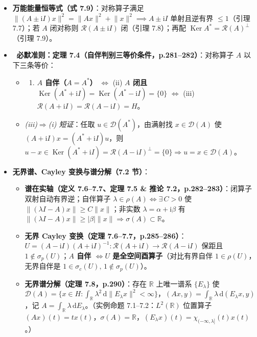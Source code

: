 \documentclass[11pt,a4paper]{article}
\providecommand{\tightlist}{\setlength{\itemsep}{1.8pt}\setlength{\parskip}{0pt}}
\newcommand{\WarnBadge}{%
  \tcbox[on line, colback=CoralSoft, colframe=CoralMain!45!BorderColor, boxrule=0.35pt,
    arc=3pt, left=3.5pt, right=3.5pt, top=0.5pt, bottom=0.5pt, boxsep=0pt]{\scriptsize\bfseries\color{CoralMain}注意}\,%
}
\begin{document}
\begin{itemize}
\tightlist
\item
  \textbf{万能能量恒等式（式 7.9）}：对称算子满足 \(\lVert(A\pm\mathrm{i}I)x\rVert^2=\lVert Ax\rVert^2+\lVert x\rVert^2\implies A\pm\mathrm{i}I\) 单射且逆有界 \(\le 1\)（引理 7.7）；若 \(A\) 闭对称则 \(\mathcal{R}(A\pm\mathrm{i}I)\) 闭（引理 7.8）；再配 \(\operatorname{Ker}A^*=\mathcal{R}(A)^\perp\)（引理 7.9）。
\item
  \textbf{\WarnBadge{} 必默准则：定理 7.4（自伴判别三等价条件，p.281--282）}：对称算子 \(A\) 以下三条等价：

  \begin{itemize}
  \tightlist
  \item
    \begin{enumerate}
    \def\labelenumi{(\roman{enumi})}
    \tightlist
    \item
      \textbf{\(A\) 自伴（\(A=A^*\)）} \(\iff\) (ii) \textbf{\(A\) 闭且 \(\operatorname{Ker}(A^*+\mathrm{i}I)=\operatorname{Ker}(A^*-\mathrm{i}I)=\{0\}\)} \(\iff\) (iii) \textbf{\(\mathcal{R}(A+\mathrm{i}I)=\mathcal{R}(A-\mathrm{i}I)=H\)}。
    \end{enumerate}
  \item
    \emph{(iii)\(\Rightarrow\)(i) 短证}：任取 \(u\in\mathcal{D}(A^*)\)，由满射找 \(x\in\mathcal{D}(A)\) 使 \((A+\mathrm{i}I)x=(A^*+\mathrm{i}I)u\)，则 \(u-x\in\operatorname{Ker}(A^*+\mathrm{i}I)=\mathcal{R}(A-\mathrm{i}I)^\perp=\{0\}\Rightarrow u=x\in\mathcal{D}(A)\)。
  \end{itemize}
\item
  \textbf{无界谱、Cayley 变换与谱分解（7.2 节）}：

  \begin{itemize}
  \tightlist
  \item
    \textbf{谱在实轴（定义 7.6--7.7、定理 7.5 \& 推论 7.2，p.282--283）}：闭算子双射自动有界逆；自伴算子 \(\lambda\in\rho(A)\iff\exists\,C>0\) 使 \(\lVert(\lambda I-A)x\rVert\ge C\lVert x\rVert\)；非实数 \(\lambda=\alpha+\mathrm{i}\beta\) 有 \(\lVert(\lambda I-A)x\rVert\ge\lvert\beta\rvert\lVert x\rVert\Rightarrow\sigma(A)\subset\mathbb{R}\)。
  \item
    \textbf{无界 Cayley 变换（定理 7.6--7.7，p.285--286）}：\(U=(A-\mathrm{i}I)(A+\mathrm{i}I)^{-1}:\mathcal{R}(A+\mathrm{i}I)\to\mathcal{R}(A-\mathrm{i}I)\) 保距且 \(1\notin\sigma_p(U)\)；\textbf{\(A\) 自伴 \(\iff U\) 是全空间酉算子}（对比有界自伴 \(1\in\rho(U)\)，无界自伴是 \(1\in\sigma_c(U),\,1\notin\sigma_p(U)\)）。
  \item
    \textbf{无界谱分解（定理 7.8，p.290）}：存在 \(\mathbb{R}\) 上唯一谱系 \(\{E_\lambda\}\) 使 \(\mathcal{D}(A)=\{x\in H:\int_{\mathbb{R}}\lambda^2\,\mathrm{d}\lVert E_\lambda x\rVert^2<\infty\}\)，\((Ax,y)=\int_{\mathbb{R}}\lambda\,\mathrm{d}(E_\lambda x,y)\)，记 \(A=\int_{\mathbb{R}}\lambda\,\mathrm{d}E_\lambda\)。（实例命题 7.1--7.2：\(L^2(\mathbb{R})\) 位置算子 \((Ax)(t)=tx(t)\)，\(\sigma(A)=\mathbb{R}\)，\((E_\lambda x)(t)=\chi_{(-\infty,\lambda]}(t)x(t)\)。）
  \end{itemize}
\end{itemize}
\end{document}
